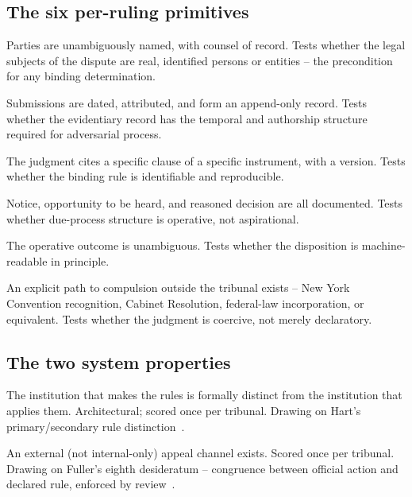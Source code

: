 \documentclass[11pt,letterpaper]{article}
\begin{document}
\subsection{The six per-ruling primitives}

\begin{description}[itemsep=4pt,leftmargin=1.6em,style=nextline]
\item[\textbf{PR1 Identity}] Parties are unambiguously named, with counsel of record. Tests whether the legal subjects of the dispute are real, identified persons or entities -- the precondition for any binding determination.
\item[\textbf{PR2 Evidence log}] Submissions are dated, attributed, and form an append-only record. Tests whether the evidentiary record has the temporal and authorship structure required for adversarial process.
\item[\textbf{PR3 Rule bind}] The judgment cites a specific clause of a specific instrument, with a version. Tests whether the binding rule is identifiable and reproducible.
\item[\textbf{PR4 Procedure}] Notice, opportunity to be heard, and reasoned decision are all documented. Tests whether due-process structure is operative, not aspirational.
\item[\textbf{PR5 Ruling}] The operative outcome is unambiguous. Tests whether the disposition is machine-readable in principle.
\item[\textbf{PR6 Enforcement bridge}] An explicit path to compulsion outside the tribunal exists -- New York Convention recognition, Cabinet Resolution, federal-law incorporation, or equivalent. Tests whether the judgment is coercive, not merely declaratory.
\end{description}

\subsection{The two system properties}

\begin{description}[itemsep=4pt,leftmargin=1.6em,style=nextline]
\item[\textbf{SP1 Separation of powers}] The institution that makes the rules is formally distinct from the institution that applies them. Architectural; scored once per tribunal. Drawing on Hart's primary/secondary rule distinction~\cite{hart}.
\item[\textbf{SP2 Appeal path}] An external (not internal-only) appeal channel exists. Scored once per tribunal. Drawing on Fuller's eighth desideratum -- congruence between official action and declared rule, enforced by review~\cite{fuller}.
\end{description}
\end{document}
